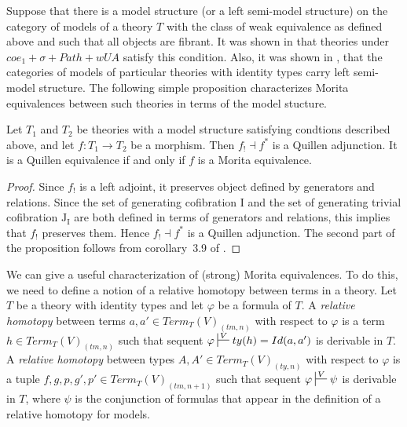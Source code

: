 \documentclass[reqno]{amsart}
\theoremstyle{definition}
\theoremstyle{remark}
\newcommand{\I}{\mathrm{I}}
\newcommand{\J}{\mathrm{J}}
\numberwithin{figure}{section}
\begin{document}
Suppose that there is a model structure (or a left semi-model structure) on the category of models of a theory $T$
with the class of weak equivalence as defined above and such that all objects are fibrant.
It was shown in \cite{alg-models} that theories under $coe_1 + \sigma + Path + wUA$ satisfy this condition.
Also, it was shown in \cite{kap-lum-model}, that the categories of models of particular theories with identity types carry left semi-model structure.
The following simple proposition characterizes Morita equivalences between such theories in terms of the model stucture.

\begin{prop}
Let $T_1$ and $T_2$ be theories with a model structure satisfying condtions described above, and let $f : T_1 \to T_2$ be a morphism.
Then $f_! \dashv f^*$ is a Quillen adjunction.
It is a Quillen equivalence if and only if $f$ is a Morita equivalence.
\end{prop}
\begin{proof}
Since $f_!$ is a left adjoint, it preserves object defined by generators and relations.
Since the set of generating cofibration $\I$ and the set of generating trivial cofibration $\J_\I$
are both defined in terms of generators and relations, this implies that $f_!$ preserves them.
Hence $f_! \dashv f^*$ is a Quillen adjunction.
The second part of the proposition follows from corollary~3.9 of \cite{f-model-structures}.
\end{proof}

We can give a useful characterization of (strong) Morita equivalences.
To do this, we need to define a notion of a relative homotopy between terms in a theory.
Let $T$ be a theory with identity types and let $\varphi$ be a formula of $T$.
A \emph{relative homotopy} between terms $a,a' \in Term_T(V)_{(tm,n)}$ with respect to $\varphi$ is a term $h \in Term_T(V)_{(tm,n)}$
such that sequent $\varphi \sststile{}{V} ty(h) = Id(a,a')$ is derivable in $T$.
A \emph{relative homotopy} between types $A,A' \in Term_T(V)_{(ty,n)}$ with respect to $\varphi$ is a tuple $f,g,p,g',p' \in Term_T(V)_{(tm,n+1)}$
such that sequent $\varphi \sststile{}{V} \psi$ is derivable in $T$, where $\psi$ is the conjunction of formulas that appear in the definition of a relative homotopy for models.
\end{document}
